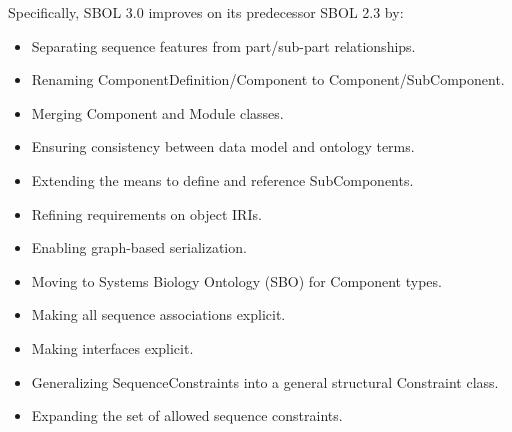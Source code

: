 Specifically, SBOL 3.0 improves on its predecessor SBOL 2.3 by:
\begin{itemize}
\item Separating sequence features from part/sub-part relationships.
\item Renaming ComponentDefinition/Component to Component/SubComponent.
\item Merging Component and Module classes.
\item Ensuring consistency between data model and ontology terms.
\item Extending the means to define and reference SubComponents.
\item Refining requirements on object IRIs.
\item Enabling graph-based serialization.
\item Moving to Systems Biology Ontology (SBO) for Component types.
\item Making all sequence associations explicit.
\item Making interfaces explicit.
\item Generalizing SequenceConstraints into a general structural Constraint class.
\item Expanding the set of allowed sequence constraints.
\end{itemize}

